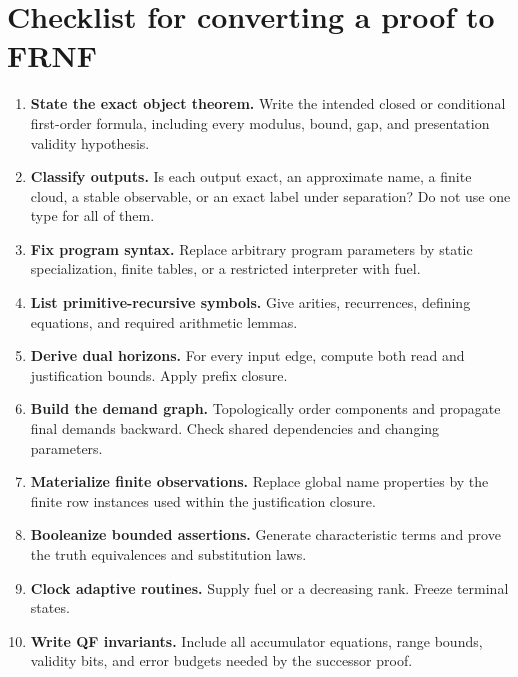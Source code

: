 \section{Checklist for converting a proof to FRNF}
\label{app:checklist}

\begin{enumerate}[label=\textbf{\arabic*.},leftmargin=3em]
\item \textbf{State the exact object theorem.}  Write the intended closed or
conditional first-order formula, including every modulus, bound, gap, and presentation
validity hypothesis.

\item \textbf{Classify outputs.}  Is each output exact, an approximate name, a finite
cloud, a stable observable, or an exact label under separation?  Do not use one type
for all of them.

\item \textbf{Fix program syntax.}  Replace arbitrary program parameters by static
specialization, finite tables, or a restricted interpreter with fuel.

\item \textbf{List primitive-recursive symbols.}  Give arities, recurrences, defining
equations, and required arithmetic lemmas.

\item \textbf{Derive dual horizons.}  For every input edge, compute both read and
justification bounds.  Apply prefix closure.

\item \textbf{Build the demand graph.}  Topologically order components and propagate
final demands backward.  Check shared dependencies and changing parameters.

\item \textbf{Materialize finite observations.}  Replace global name properties by
the finite row instances used within the justification closure.

\item \textbf{Booleanize bounded assertions.}  Generate characteristic terms and prove
the truth equivalences and substitution laws.

\item \textbf{Clock adaptive routines.}  Supply fuel or a decreasing rank.  Freeze
terminal states.

\item \textbf{Write QF invariants.}  Include all accumulator equations, range bounds,
validity bits, and error budgets needed by the successor proof.


\end{enumerate}
